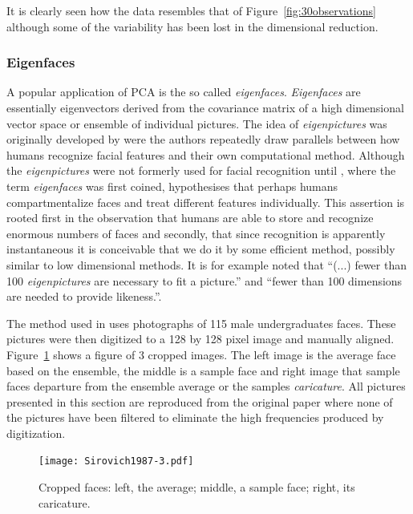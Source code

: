 It is clearly seen how the data resembles that of Figure~\ref{fig:30observations} although some of the variability has been lost in the dimensional reduction.

\subsubsection{Eigenfaces}
A popular application of PCA is the so called \emph{eigenfaces}\cite{Sirovich1987}\cite{Turk1991}\cite{Zaeri2006}. \emph{Eigenfaces} are essentially eigenvectors derived from the covariance matrix of a high dimensional vector space or ensemble of individual pictures. The idea of \emph{eigenpictures} was originally developed by \cite{Sirovich1987} were the authors repeatedly draw parallels between how humans recognize facial features and their own computational method. Although the \emph{eigenpictures} were not formerly used for facial recognition until \cite{Turk1991}, where the term \emph{eigenfaces} was first coined, \cite{Sirovich1987} hypothesises that perhaps humans compartmentalize faces and treat different features individually. This assertion is rooted first in the observation that humans are able to store and recognize enormous numbers of faces and secondly, that since recognition is apparently instantaneous it is conceivable that we do it by some efficient method, possibly similar to low dimensional methods. It is for example noted that ``(...) fewer than 100 \emph{eigenpictures} are necessary to fit a picture.'' and ``fewer than 100 dimensions are needed to provide likeness.''.

The method used in \cite{Sirovich1987} uses photographs of 115 male undergraduates faces. These pictures were then digitized to a 128 by 128 pixel image and manually aligned. Figure~\ref{fig:Sirovich1987-3} shows a figure of 3 cropped images. The left image is the average face based on the ensemble, the middle is a sample face and right image that sample faces departure from the ensemble average or the samples \emph{caricature}. All pictures presented in this section are reproduced from the original paper \cite{Sirovich1987} where none of the pictures have been filtered to eliminate the high frequencies produced by digitization.

\begin{figure}[!]
  \begin{center}
    \texttt{[image: Sirovich1987-3.pdf]}
    \caption{Cropped faces: left, the average; middle, a sample face; right, its caricature.}\label{fig:Sirovich1987-3}
  \end{center}
\end{figure}

